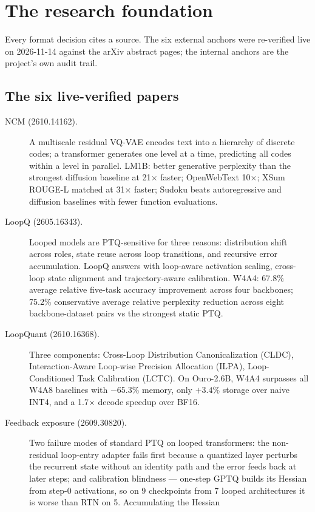 \chapter{The research foundation}

Every format decision cites a source. The six external anchors were re-verified live on
2026-11-14 against the arXiv abstract pages; the internal anchors are the project's own audit
trail.

\section{The six live-verified papers}

\begin{description}
\item[NCM (2610.14162).] A multiscale residual VQ-VAE encodes text into a hierarchy of
discrete codes; a transformer generates one level at a time, predicting all codes within a
level in parallel. LM1B: better generative perplexity than the strongest diffusion baseline at
21$\times$ faster; OpenWebText 10$\times$; XSum ROUGE-L matched at 31$\times$ faster; Sudoku
beats autoregressive and diffusion baselines with fewer function evaluations.
\item[LoopQ (2605.16343).] Looped models are PTQ-sensitive for three reasons: distribution
shift across roles, state reuse across loop transitions, and recursive error accumulation.
LoopQ answers with loop-aware activation scaling, cross-loop state alignment and
trajectory-aware calibration. W4A4: 67.8\% average relative five-task accuracy improvement
across four backbones; 75.2\% conservative average relative perplexity reduction across eight
backbone-dataset pairs vs the strongest static PTQ.
\item[LoopQuant (2610.16368).] Three components: Cross-Loop Distribution Canonicalization
(CLDC), Interaction-Aware Loop-wise Precision Allocation (ILPA), Loop-Conditioned Task
Calibration (LCTC). On Ouro-2.6B, W4A4 surpasses all W4A8 baselines with $-65.3\%$ memory,
only $+3.4\%$ storage over naive INT4, and a 1.7$\times$ decode speedup over BF16.
\item[Feedback exposure (2609.30820).] Two failure modes of standard PTQ on looped
transformers: the non-residual loop-entry adapter fails first because a quantized layer
perturbs the recurrent state without an identity path and the error feeds back at later steps;
and calibration blindness --- one-step GPTQ builds its Hessian from step-0 activations, so on
9 checkpoints from 7 looped architectures it is worse than RTN on 5. Accumulating the Hessian

\end{description}
